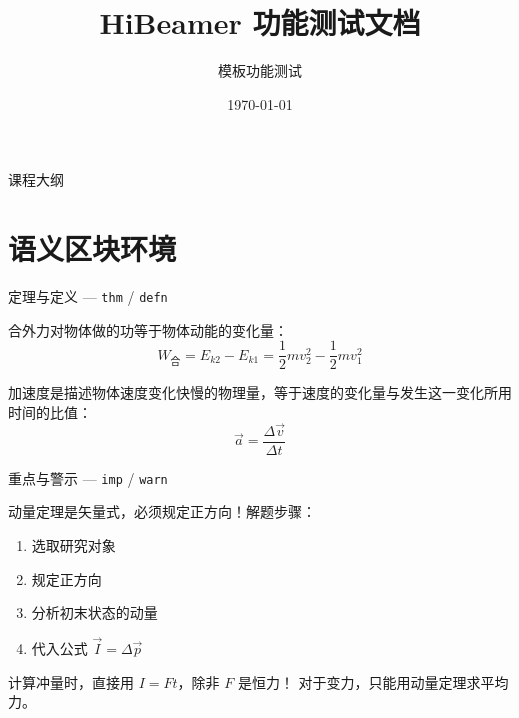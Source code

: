 \documentclass[darkmode=false, randomquote=true, quoteseed=2026, shownav=false,handout=false]{HiBeamer}
\title{HiBeamer 功能测试文档}
\author{模板功能测试}
\date{\today}
\begin{document}
\begin{frame}[plain]
  \titlepage
\end{frame}

\begin{frame}{课程大纲}
  \tableofcontents
\end{frame}

\section{语义区块环境}

\begin{frame}{定理与定义 --- \texttt{thm} / \texttt{defn}}
  \begin{thm}[动能定理]
  	合外力对物体做的功等于物体动能的变化量：
  	\[ W_{\text{合}} = E_{k2} - E_{k1} = \frac{1}{2}mv_2^2 - \frac{1}{2}mv_1^2 \]
  \end{thm}
	\vfil
  \begin{defn}[加速度]
    加速度是描述物体速度变化快慢的物理量，等于速度的变化量与发生这一变化所用时间的比值：
    \[ \vec{a} = \frac{\Delta \vec{v}}{\Delta t} \]
  \end{defn}

  
\end{frame}

\begin{frame}{重点与警示 --- \texttt{imp} / \texttt{warn}}
  \begin{imp}[核心考点]
    动量定理是矢量式，必须规定正方向！解题步骤：
    \begin{enumerate}
      \item 选取研究对象
      \item 规定正方向
      \item 分析初末状态的动量
      \item 代入公式 $\vec{I} = \Delta \vec{p}$
    \end{enumerate}
  \end{imp}
	\vfil
  \begin{warn}[易错警示]
    计算冲量时，直接用 $I = Ft$，除非 $F$ 是恒力！
    对于变力，只能用动量定理求平均力。
  \end{warn}

\end{frame}
\end{document}
